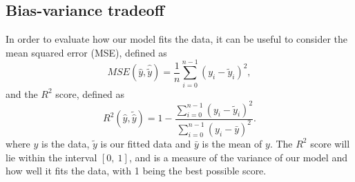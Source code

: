 \documentclass[a4paper, 10pt]{article}
\begin{document}
\begin{multicols}{2}
\subsection{Bias-variance tradeoff}
In order to evaluate how our model fits the data, it can be useful to consider the mean squared error (MSE), defined as 
\begin{equation}
    MSE(\hat{y},\hat{\tilde{y}}) = \frac{1}{n}
    \sum_{i=0}^{n-1}(y_i-\tilde{y}_i)^2, 
    \label{eq:MSE}
\end{equation}
and the $R^2$ score, defined as 
\begin{equation}
    R^2(\hat{y}, \tilde{\hat{y}}) = 1 - \frac{\sum_{i=0}^{n - 1} (y_i - \tilde{y}_i)^2}{\sum_{i=0}^{n - 1} (y_i - \bar{y})^2}.
    \label{eq:R2}
\end{equation}
where $y$ is the data, $\tilde{y}$ is our fitted data and $\bar{y}$ is the mean of $y$.  The $R^2$ score will lie within the interval $[0,\ 1]$, and is a measure of the variance of our model and how well it fits the data, with 1 being the best possible score. 


\end{multicols}
\end{document}
